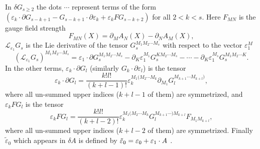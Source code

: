 \documentclass[a4paper,12pt]{article}
\begin{document}
In $\delta G_{s\geq 2}$ the dots $\cdots $ represent terms of the form $%
\left( \varepsilon _{k}\cdot \partial G_{s-k+1}-G_{s-k+1}\cdot \partial
\varepsilon _{k}+\varepsilon _{k}FG_{s-k+2}\right) $ for all $2<k<s.$ Here $%
F_{MN}$ is the gauge field strength
\begin{equation}
F_{MN}\left( X\right) =\partial _{M}A_{N}\left( X\right) -\partial
_{N}A_{M}\left( X\right) ,
\end{equation}
$\mathcal{L}_{\varepsilon _{1}}G_{s}$ is the Lie derivative of the tensor $%
G_{s}^{M_{1}M_{2}\cdots M_{s}}$ with respect to the vector $\varepsilon
_{1}^{M}$%
\begin{equation}
\left( \mathcal{L}_{\varepsilon _{1}}G_{s}\right) ^{M_{1}M_{2}\cdots
M_{s}}=\varepsilon _{1}\cdot \partial G_{s}^{M_{1}M_{2}\cdots
M_{s}}-\partial _{K}\varepsilon _{1}^{M_{1}}G_{s}^{KM_{2}\cdots
M_{s}}-\cdots -\partial _{K}\varepsilon _{1}^{M_{s}}G_{s}^{M_{1}M_{2}\cdots
K}.  \label{lie}
\end{equation}
In the other terms, $\varepsilon _{k}\cdot \partial G_{l}$ (similarly $%
G_{k}\cdot \partial \varepsilon _{l}$) is the tensor
\begin{equation}
\varepsilon _{k}\cdot \partial G_{l}=\frac{k!l!}{\left( k+l-1\right) !}%
\varepsilon _{k}^{M_{1}(M_{2}\cdots M_{k}}\partial
_{M_{1}}G_{l}^{M_{k+1}\cdots M_{k+l})},
\end{equation}
where all un-summed upper indices ($k+l-1$ of them) are symmetrized, and $%
\varepsilon _{k}FG_{l}$ is the tensor
\begin{equation}
\varepsilon _{k}FG_{l}=\frac{k!l!}{\left( k+l-2\right) !}\varepsilon
_{k}^{M_{1}(M_{2}\cdots M_{k}}G_{l}^{M_{k+1}\cdots )M_{k+l}}F_{M_{1}M_{k+l}},
\end{equation}
where all un-summed upper indices ($k+l-2$ of them) are symmetrized. Finally
$\tilde{\varepsilon}_{0}$ which appears in $\delta A$ is defined by $\tilde{%
\varepsilon}_{0}=\varepsilon _{0}+\varepsilon _{1}\cdot A$ .
\end{document}
